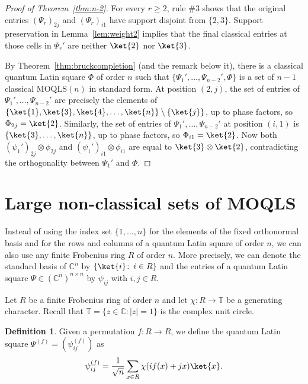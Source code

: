 \documentclass[a4paper]{article}
\theoremstyle{definition}
\newtheorem{definition}[theorem]{Definition}
\newcommand{\CC}{\mathbb C}
\newcommand{\MOQLS}[1]{\(\mathrm{MOQLS}(#1)\)}
\begin{document}
\begin{proof}[Proof of Theorem~\ref{thm:n-2}]
    For every \(r\geq2\), rule \#3 shows that the original entries \((\Psi_r)_{2j}\) and \((\Psi_r)_{i1}\) have support disjoint from \(\{2,3\}\). Support preservation in Lemma~\ref{lem:weight2} implies that the final classical entries at those cells in \(\Psi_r'\) are neither \(\ket{2}\) nor \(\ket{3}\).
    
    By Theorem~\ref{thm:bruckcompletion} (and the remark below it), there is a classical quantum Latin square \(\Phi\) of order \(n\) such that \(\{\Psi_1',\dots,\Psi_{n-2}',\Phi\}\) is a set of \(n-1\) classical \MOQLS{n} in standard form.
    At position \((2,j)\), the set of entries of \(\Psi_1',\dots,\Psi_{n-2}'\) are precisely the elements of \(\{\ket{1},\ket{3},\ket{4},\dots,\ket{n}\}\setminus\{\ket{j}\}\), up to phase factors, so \(\Phi_{2j}=\ket{2}\). Similarly, the set of entries of \(\Psi_1',\dots,\Psi_{n-2}'\) at position \((i,1)\) is \(\{\ket{3},\dots,\ket{n}\}\), up to phase factors, so \(\Phi_{i1}=\ket{2}\). Now both \(\left(\psi_1'\right)_{2j}\otimes\phi_{2j}\) and \(\left(\psi_1'\right)_{i1}\otimes\phi_{i1}\) are equal to \(\ket{3}\otimes\ket{2}\), contradicting the orthogonality between \(\Psi_1'\) and \(\Phi\).
\end{proof}

\section{Large non-classical sets of MOQLS}\label{sec:construction}

Instead of using the index set \(\{1,\dots,n\}\) for the elements of the fixed orthonormal basis and for the rows and columns of a quantum Latin square of order \(n\), we can also use any finite Frobenius ring \(R\) of order \(n\). More precisely, we can denote the standard basis of \(\CC^n\) by \(\{\ket{i}\colon\,i\in R\}\) and the entries of a quantum Latin square \(\Psi\in(\CC^n)^{n\times n}\) by \(\psi_{ij}\) with \(i,j\in R\).

Let \(R\) be a finite Frobenius ring of order \(n\) and let \(\chi:R\to\mathbb{T}\) be a generating character. Recall that \(\mathbb{T}=\{z\in\mathbb{C}:|z|=1\}\) is the complex unit circle. %

\begin{definition}\label{def:construction}
    Given a permutation \(f:R\to R\), we define the quantum Latin square \(\Psi^{(f)}=(\psi_{ij}^{(f)})\) as
    \[\psi_{ij}^{(f)}=\frac1{\sqrt{n}}\sum_{x\in R}\chi(if(x)+jx)\ket{x}.\]
\end{definition}
\end{document}
